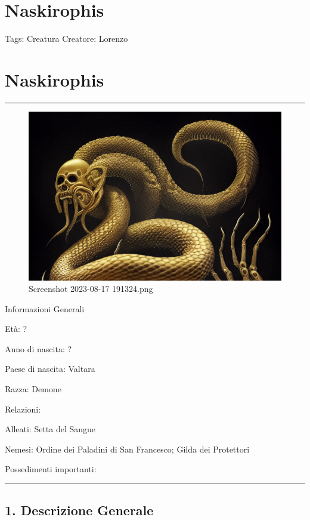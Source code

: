 \section{Naskirophis}\label{naskirophis}

Tags: Creatura Creatore: Lorenzo

\section{Naskirophis}\label{naskirophis-1}

\begin{center}\rule{0.5\linewidth}{0.5pt}\end{center}

\begin{figure}
\centering
\includegraphics{Screenshot_2023-08-17_191324.png}
\caption{Screenshot 2023-08-17 191324.png}
\end{figure}

Informazioni Generali

Età: ?

Anno di nascita: ?

Paese di nascita: Valtara

Razza: Demone

Relazioni:

Alleati: Setta del Sangue

Nemesi: Ordine dei Paladini di San Francesco; Gilda dei Protettori

Possedimenti importanti:

\begin{center}\rule{0.5\linewidth}{0.5pt}\end{center}

\subsection{1. Descrizione Generale}\label{descrizione-generale}

